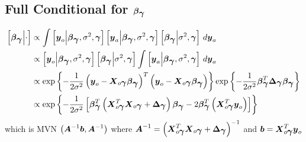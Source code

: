 \documentclass[fleqn]{article}
\def\bm#1{\mbox{\boldmath $#1$}}
\begin{document}
\subsection{Full Conditional for $\bm{\beta}_{\bm{\gamma}}$}
%
\begin{align*}
%
\left[ \bm{\beta}_{\bm{\gamma}} \middle| \cdot \right] & \propto \int \left[ \bm{y}_o \middle| \bm{\beta}_{\bm{\gamma}}, \sigma^2, \bm{\gamma} \right] \left[ \bm{y}_a \middle| \bm{\beta}_{\bm{\gamma}}, \sigma^2, \bm{\gamma} \right] \left[ \bm{\beta}_{\bm{\gamma}} \middle| \sigma^2, \bm{\gamma} \right] \, d \bm{y}_a \\
%
 & \propto \left[ \bm{y}_o \middle| \bm{\beta}_{\bm{\gamma}}, \sigma^2, \bm{\gamma} \right] \left[ \bm{\beta}_{\bm{\gamma}} \middle| \sigma^2, \bm{\gamma} \right] \int \left[ \bm{y}_a \middle| \bm{\beta}_{\bm{\gamma}}, \sigma^2, \bm{\gamma} \right]  \, d \bm{y}_a \\
%
 & \propto \exp{ \left\{ - \frac{1} {2 \sigma^2} \left( \bm{y}_o - \bm{X}_{o \bm{\gamma}} \bm{\beta}_{\bm{\gamma}} \right)^T \left( \bm{y}_o - \bm{X}_{o \bm{\gamma}} \bm{\beta}_{\bm{\gamma}} \right) \right\} } \exp{ \left\{ - \frac{1} {2 \sigma^2} \bm{\beta}_{\bm{\gamma}}^T \bm{\Delta}_{\bm{\gamma}} \bm{\beta}_{\bm{\gamma}} \right\} } \\
%
 & \propto \exp{ \left\{ - \frac{1} {2 \sigma^2} \left[ \bm{\beta}_{\bm{\gamma}}^T \left(\bm{X}_{o \bm{\gamma}}^T \bm{X}_{o \bm{\gamma}} + \bm{\Delta}_{\bm{\gamma}} \right) \bm{\beta}_{\bm{\gamma}} - 2 \bm{\beta}_{\bm{\gamma}}^T \left( \bm{X}_{o \bm{\gamma}}^T \bm{y}_o \right) \right] \right\} } \\
%
\end{align*}
%
which is MVN $\left( \bm{A}^{ - 1} \bm{b}, \bm{A}^{ - 1} \right)$ where $\bm{A}^{ - 1} = \left( \bm{X}_{o \bm{\gamma}}^T \bm{X}_{o \bm{\gamma}} + \bm{\Delta}_{\bm{\gamma}} \right)^{ - 1}$ and $\bm{b} = \bm{X}_{o \bm{\gamma}}^T \bm{y}_o$
%
\end{document}
